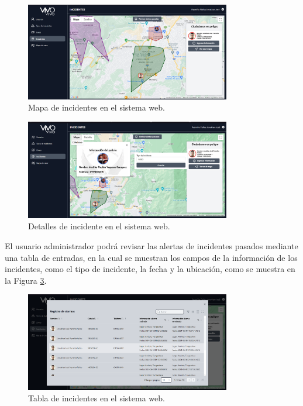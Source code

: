 \begin{figure}[H]
    \centering
    \includegraphics[width=0.8\textwidth]{chapters/III-resultados-y-discusion/resources/images/mapa-incidentes-web.png}
    \caption{Mapa de incidentes en el sistema web.}
    \label{fig:mapa-incidentes-web}
\end{figure}

\begin{figure}[H]
    \centering
    \includegraphics[width=0.8\textwidth]{chapters/III-resultados-y-discusion/resources/images/detalles-incidente-web.png}
    \caption{Detalles de incidente en el sistema web.}
    \label{fig:detalles-incidente-web}
\end{figure}

El usuario administrador podrá revisar las alertas de incidentes pasados mediante una tabla de entradas, en la cual se muestran los
campos de la información de los incidentes, como el tipo de incidente, la fecha y la ubicación, como se muestra en la Figura
\ref{fig:tabla-incidentes-web}.

\begin{figure}[H]
    \centering
    \includegraphics[width=0.8\textwidth]{chapters/III-resultados-y-discusion/resources/images/tabla-incidentes-web.png}
    \caption{Tabla de incidentes en el sistema web.}
    \label{fig:tabla-incidentes-web}
\end{figure}

